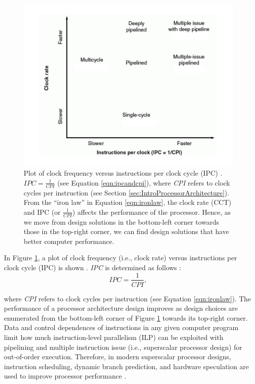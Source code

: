 
\begin{figure}[h]
\centering 
\includegraphics[width=6in]{./pics/frequency-vs-ipc}
\caption{Plot of clock frequency versus instructions per clock cycle (IPC) \cite{Patterson2005}. $IPC = \frac{1}{CPI}$ (see Equation \ref{eqn:ipcandcpi}), where {\it CPI} refers to clock cycles per instruction (see Section \ref{sec:IntroProcessorArchitecture}). From the ``iron law'' in Equation \ref{eqn:ironlaw}, the clock rate (CCT) and IPC (or $\frac{1}{CPI}$) affects the performance of the processor. Hence, as we move from design solutions in the bottom-left corner towards those in the top-right corner, we can find design solutions that have better computer performance.}
\label{fig:frequencyvsipc}
\end{figure}

In Figure \ref{fig:frequencyvsipc}, a plot of clock frequency (i.e., clock rate) versus instructions per clock cycle (IPC) is shown \cite{Patterson2005}. {\it IPC} is determined as follows \cite{Shen2005a}:
\begin{equation}
\label{eqn:ipcandcpi}
IPC = \frac{1}{CPI},
\end{equation}

where {\it CPI} refers to clock cycles per instruction (see Equation \ref{eqn:ironlaw}). The performance of a processor architecture design improves as design choices are enumerated from the bottom-left corner of Figure \ref{fig:frequencyvsipc} towards its top-right corner. Data and control dependences of instructions in any given computer program limit how much instruction-level parallelism (ILP) can be exploited with pipelining and multiple instruction issue (i.e., superscalar processor design) for out-of-order execution. Therefore, in modern superscalar processor designs, instruction scheduling, dynamic branch prediction, and hardware speculation are used to improve processor performance \cite{Patterson2005,Shen2005a,Hennessy2012}. \\

